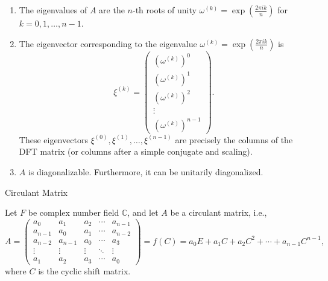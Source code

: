 \documentclass[11pt]{../../TexTemplate/elegantbook} %
\begin{document}
\begin{enumerate}
    \item The eigenvalues of \(A\) are the \(n\)-th roots of unity 
        \(\omega^{(k)} = \exp\left(\frac{2\pi i k}{n}\right)\) for \(k = 0, 1, \ldots, n-1\).
    \item The eigenvector corresponding to the eigenvalue 
        \(\omega^{(k)} = \exp\left(\frac{2\pi i k}{n}\right)\) is 
        \[
        \xi^{(k)} =
        \begin{pmatrix}
            \left(\omega^{(k)}\right)^{0} \\
            \left(\omega^{(k)}\right)^{1} \\
            \left(\omega^{(k)}\right)^{2} \\
            \vdots \\
            \left(\omega^{(k)}\right)^{n-1}
        \end{pmatrix}.
        \]
        These eigenvectors \(\xi^{(0)}, \xi^{(1)}, \ldots, \xi^{(n-1)}\) 
        are precisely the columns of the DFT matrix (or columns after a simple conjugate and scaling).
    \item \(A\) is diagonalizable. Furthermore, it can be unitarily diagonalized.
\end{enumerate}


\begin{leftbarTitle}{Circulant Matrix}\end{leftbarTitle}
Let \(F\) be complex number field \( \mathbb{C} \), and let \(A\) be a circulant matrix, i.e.,
\[
A = \begin{pmatrix}
    a_0 & a_1 & a_{2} & \cdots & a_{n-1} \\
    a_{n-1} & a_0 & a_{1} & \cdots & a_{n-2} \\
    a_{n-2} & a_{n-1} & a_0 & \cdots & a_3 \\
    \vdots & \vdots & \vdots & \ddots & \vdots \\
    a_{1} & a_{2} & a_{3} & \cdots & a_0
\end{pmatrix} = f( C ) =
a_{0}E + a_{1}C + a_{2}C^{2} + \cdots + a_{n-1}C^{n-1},
\]
where \(C\) is the cyclic shift matrix.
\end{document}
